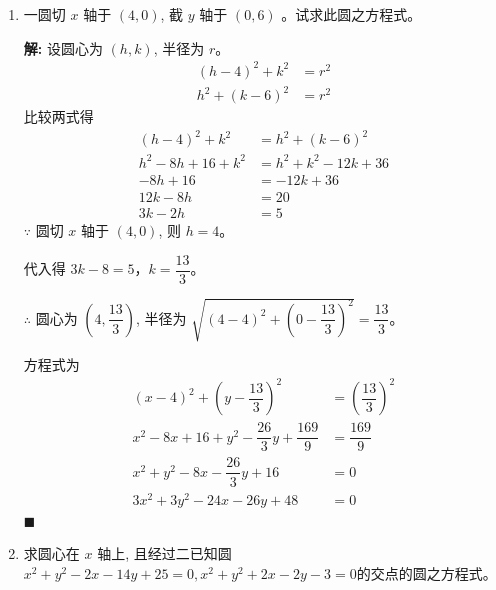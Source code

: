 \documentclass[10pt]{article}
\newcommand{\sol}{\textbf{解:} }
\begin{document}
\begin{enumerate}[leftmargin=*]
        \newpage
  \item 一圆切 $x$ 轴于 $(4,0)$, 截 $y$ 轴于 $(0,6)$ 。试求此圆之方程式。

        \sol{}
        设圆心为 $(h, k)$, 半径为 $r$。
        \begin{align*}
          (h-4)^{2} + k^{2} & = r^{2} \\
          h^{2} + (k-6)^{2} & = r^{2}
        \end{align*}
        比较两式得
        \begin{align*}
          (h-4)^{2} + k^{2}       & = h^{2} + (k-6)^{2}        \\
          h^{2} - 8h + 16 + k^{2} & = h^{2} + k^{2} - 12k + 36 \\
          -8h + 16                & = -12k + 36                \\
          12k - 8h                & = 20                       \\
          3k - 2h                 & = 5
        \end{align*}
        $\because$ 圆切 $x$ 轴于 $(4, 0)$, 则 $h = 4$。

        代入得 $3k - 8 = 5$，$k = \dfrac{13}{3}$。

        $\therefore$ 圆心为 $\left(4, \dfrac{13}{3}\right)$, 半径为 $\sqrt{(4-4)^{2} + \left(0-\dfrac{13}{3}\right)^{2}} = \dfrac{13}{3}$。

        方程式为
        \begin{align*}
          (x-4)^{2} + \left(y-\dfrac{13}{3}\right)^{2}              & = \left(\dfrac{13}{3}\right)^{2} \\
          x^{2} - 8x + 16 + y^{2} - \dfrac{26}{3}y + \dfrac{169}{9} & = \dfrac{169}{9}                 \\
          x^{2} + y^{2} - 8x - \dfrac{26}{3}y + 16                  & = 0                              \\
          3x^{2} + 3y^{2} - 24x - 26y + 48                          & = 0
        \end{align*} \hfill$\blacksquare$

  \item 求圆心在 $x$ 轴上, 且经过二已知圆 $x^{2}+y^{2}-2 x-14 y+25=0, x^{2}+y^{2}+2 x-2 y-3=0$的交点的圆之方程式。


\end{enumerate}
\end{document}
